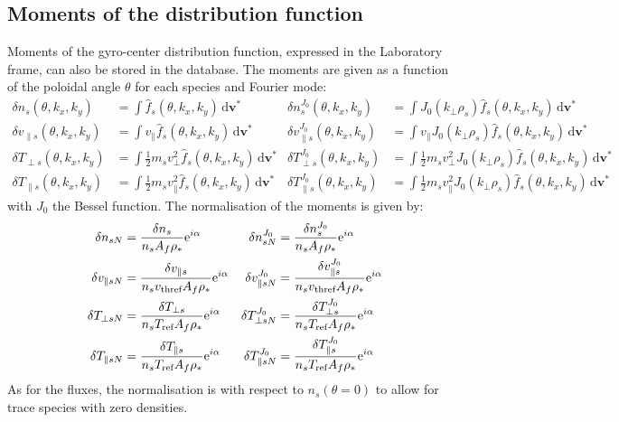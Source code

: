 \documentclass[a4paper]{report}
\begin{document}
\subsection{Moments of the distribution function} \label{sec:moments}
Moments of the gyro-center distribution function, expressed in the Laboratory frame, can also be stored in the database. The moments are given as a function of the poloidal angle $\theta$ for each species and Fourier mode:
\begin{align*}
\delta n_s(\theta,k_x,k_y) & =  \int \hat{f}_s(\theta,k_x,k_y) \,\textrm{d}\mathbf{v^*}& \delta n_s^{J_0}(\theta,k_x,k_y) & =  \int J_0(k_\perp\rho_s) \hat{f}_s(\theta,k_x,k_y) \,\textrm{d}\mathbf{v^*} \\
\delta v_{\parallel s}(\theta,k_x,k_y) & =  \int v_\parallel \hat{f}_s(\theta,k_x,k_y) \,\textrm{d}\mathbf{v^*}& \delta v_{\parallel s}^{J_0}(\theta,k_x,k_y) & =  \int v_\parallel J_0(k_\perp\rho_s) \hat{f}_s(\theta,k_x,k_y) \,\textrm{d}\mathbf{v^*}\\
\delta T_{\perp s}(\theta,k_x,k_y) & =  \int \frac{1}{2}m_s v_\perp^2 \hat{f}_s(\theta,k_x,k_y) \,\textrm{d}\mathbf{v^*}& \delta T_{\perp s}^{J_0}(\theta,k_x,k_y) & =  \int \frac{1}{2}m_s v_\perp^2 J_0(k_\perp\rho_s) \hat{f}_s(\theta,k_x,k_y) \,\textrm{d}\mathbf{v^*}\\
\delta T_{\parallel s}(\theta,k_x,k_y) & =  \int \frac{1}{2}m_s v_\parallel^2 \hat{f}_s(\theta,k_x,k_y) \,\textrm{d}\mathbf{v^*}& \delta T_{\parallel s}^{J_0}(\theta,k_x,k_y) & =  \int \frac{1}{2}m_s v_\parallel^2 J_0(k_\perp\rho_s) \hat{f}_s(\theta,k_x,k_y) \,\textrm{d}\mathbf{v^*}
\end{align*}
with $J_0$ the Bessel function. The normalisation of the moments is given by:
\begin{align*}
\delta n_{sN} & = \frac{\delta n_s}{n_s A_f\rho_*}\textrm{e}^{i\alpha} & \delta n_{sN}^{J_0} & = \frac{\delta n_s^{J_0}}{n_s A_f\rho_*}\textrm{e}^{i\alpha} \\
\delta v_{\parallel sN} & = \frac{\delta v_{\parallel s}}{n_sv_\textrm{thref} A_f\rho_*}\textrm{e}^{i\alpha}& \delta v_{\parallel sN}^{J_0} & = \frac{\delta v_{\parallel s}^{J_0}}{n_sv_\textrm{thref} A_f\rho_*}\textrm{e}^{i\alpha} \\
\delta T_{\perp sN} & = \frac{\delta T_{\perp s}}{n_s T_{\textrm{ref}} A_f\rho_*}\textrm{e}^{i\alpha}& \delta T_{\perp sN}^{J_0} & = \frac{\delta T_{\perp s}^{J_0}}{n_s T_{\textrm{ref}} A_f\rho_*}\textrm{e}^{i\alpha} \\
\delta T_{\parallel sN} & = \frac{\delta T_{\parallel s}}{n_s T_{\textrm{ref}} A_f\rho_*}\textrm{e}^{i\alpha}& \delta T_{\parallel sN}^{J_0} & = \frac{\delta T_{\parallel s}^{J_0}}{n_s T_{\textrm{ref}} A_f\rho_*}\textrm{e}^{i\alpha} 
\end{align*}
As for the fluxes, the normalisation is with respect to $n_s(\theta=0)$ to allow for trace species with zero densities. 
\end{document}
